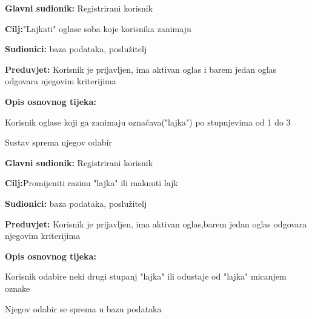 \noindent {}
\begin{packed_item}
	
	\item \textbf{Glavni sudionik: }Registrirani korisnik
	\item  \textbf{Cilj:}"Lajkati" oglase soba koje korisnika zanimaju
	\item  \textbf{Sudionici:} baza podataka, poslužitelj
	\item  \textbf{Preduvjet:} Korisnik je prijavljen, ima aktivan oglas i barem jedan oglas odgovara njegovim kriterijima
	\item  \textbf{Opis osnovnog tijeka:}
	
	\item[] \begin{packed_enum}
		
		\item Korisnik oglase koji ga zanimaju označava("lajka") po stupnjevima od 1 do 3
		\item Sustav sprema njegov odabir
	\end{packed_enum}
	
\end{packed_item}

\noindent {}
\begin{packed_item}
	
	\item \textbf{Glavni sudionik: }Registrirani korisnik
	\item  \textbf{Cilj:}Promijeniti razinu "lajka" ili maknuti lajk
	\item  \textbf{Sudionici:} baza podataka, poslužitelj
	\item  \textbf{Preduvjet:} Korisnik je prijavljen, ima aktivan oglas,barem jedan oglas odgovara njegovim kriterijima
	\item  \textbf{Opis osnovnog tijeka:}
	
	\item[] \begin{packed_enum}
		
		\item Korisnik odabire neki drugi stupanj "lajka" ili odustaje od "lajka" micanjem oznake
		\item Njegov odabir se sprema u bazu podataka
		
	\end{packed_enum}
	
\end{packed_item}

